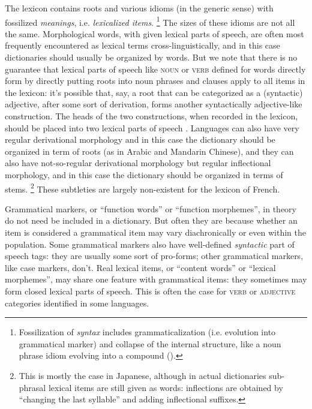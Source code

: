 \documentclass[a4paper, oneside, 12pt]{report}
\newcommand*{\citechap}[1]{chap.~{#1}}
\newcommand*{\term}[1]{\emph{#1}}
\newcommand*{\category}[1]{\textsc{#1}}
\begin{document}
The lexicon contains roots and various idioms (in the generic sense) with fossilized \emph{meanings},
i.e. \term{lexicalized items}.%
\footnote{
    Fossilization of \emph{syntax} includes grammaticalization (i.e. evolution into grammatical marker)
    and collapse of the internal structure,
    like a noun phrase idiom evolving into a compound
    ().
}
The sizes of these idioms are not all the same.
Morphological words, with given lexical parts of speech,
are often most frequently encountered as lexical terms cross-linguistically,
and in this case dictionaries should usually be organized by words.
But we note that there is no guarantee that lexical parts of speech like \category{noun} or \category{verb}
defined for words directly form by directly putting roots into noun phrases and clauses 
apply to all items in the lexicon:
it's possible that, say, a root that can be categorized as a (syntactic) adjective,
after some sort of derivation, forms another syntactically adjective-like construction.
The heads of the two constructions, when recorded in the lexicon,
should be placed into two lexical parts of speech \citep[\citechap{5}]{paul2014new}. 
Languages can also have very regular derivational morphology and in this case
the dictionary should be organized in term of roots (as in Arabic and Mandarin Chinese),
and they can also have not-so-regular derivational morphology but regular inflectional morphology,
and in this case the dictionary should be organized in terms of stems.%
\footnote{
    This is mostly the case in Japanese,
    although in actual dictionaries sub-phrasal lexical items are still given as words:
    inflections are obtained by ``changing the last syllable'' and adding inflectional suffixes.
}
These subtleties are largely non-existent for the lexicon of French.

Grammatical markers, or ``function words'' or ``function morphemes'',
in theory do not need be included in a dictionary.
But often they are because whether an item is considered a grammatical item may vary
diachronically or even within the population.
Some grammatical markers also have well-defined \emph{syntactic} part of speech tags:
they are usually some sort of pro-forms;
other grammatical markers, like case markers, don't.
Real lexical items, or ``content words'' or ``lexical morphemes'',
may share one feature with grammatical items:
they sometimes may form closed lexical parts of speech.
This is often the case for \category{verb} or \category{adjective} categories identified in some languages.
\end{document}
